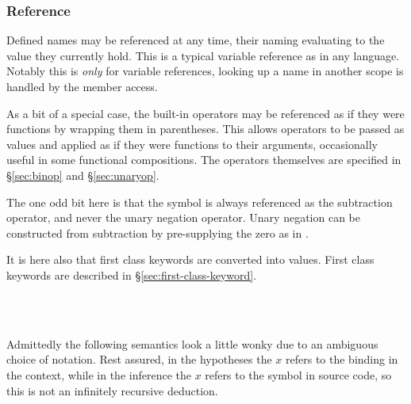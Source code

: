 \subsubsection{Reference}

Defined names may be referenced at any time, their naming evaluating to the value
they currently hold. This is a typical variable reference as in any language.
Notably this is \emph{only} for variable references, looking up a name in another
scope is handled by the member access.

As a bit of a special case, the built-in operators may be referenced as if they
were functions by wrapping them in parentheses. This allows operators to be passed
as values and applied as if they were functions to their arguments, occasionally
useful in some functional compositions. The operators themselves are specified
in \S\ref{sec:binop} and \S\ref{sec:unaryop}.

The one odd bit here is that the \op{-} symbol is always referenced as the
subtraction operator, and never the unary negation operator. Unary negation
can be constructed from subtraction by pre-supplying the zero as in .

It is here also that first class keywords are converted into values.
First class keywords are described in \S\ref{sec:first-class-keyword}.

\begin{bnf*}
     \\
     \\
\end{bnf*}

Admittedly the following semantics look a little wonky due to an ambiguous choice
of notation. Rest assured, in the hypotheses the $x$ refers to the binding in the
context, while in the inference the $x$ refers to the symbol in source code, so
this is not an infinitely recursive deduction.

\begin{prooftree}
\end{prooftree}

